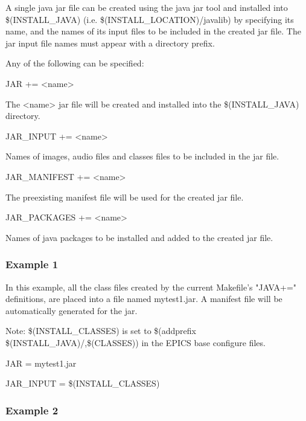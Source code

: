 A single java jar file can be created using the java jar tool and installed into \$(INSTALL\_JAVA) (i.e. 
\$(INSTALL\_LOCATION)/javalib) by specifying its name, and the names of its input files to be included in the created jar 
file. The jar input file names must appear with a directory prefix.

Any of the following can be specified:

\begin{description}\item {}JAR += \textless{}name\textgreater{}

\end{description}The \textless{}name\textgreater{} jar file will be created and installed into the \$(INSTALL\_JAVA) directory.

\begin{description}\item {}JAR\_INPUT += \textless{}name\textgreater{}

\end{description}Names of images, audio files and classes files to be included in the jar file.

\begin{description}\item {}JAR\_MANIFEST += \textless{}name\textgreater{}

\end{description}The preexisting manifest file will be used for the created jar file.

\begin{description}\item JAR\_PACKAGES += \textless{}name\textgreater{}

\end{description}Names of java packages to be installed and added to the created jar file.

\subsubsection{Example 1}

In this example, all the class files created by the current Makefile's "JAVA+=" definitions, are placed into a file named 
mytest1.jar. A manifest file will be automatically generated for the jar. 

Note: \$(INSTALL\_CLASSES) is set to \$(addprefix \$(INSTALL\_JAVA)/,\$(CLASSES)) in the EPICS base configure 
files.

\begin{description}\item {}JAR = mytest1.jar

\item {}JAR\_INPUT = \$(INSTALL\_CLASSES)

\end{description}\subsubsection{Example 2}

